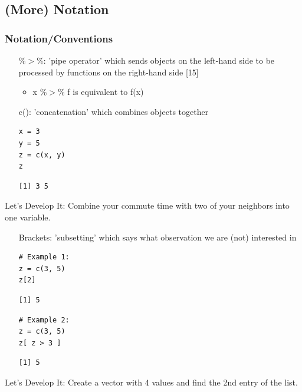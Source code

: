 \subsection{(More) Notation}
\begin{frame}
	\frametitle{Notation/Conventions}

	\vspace{10pt}
	\begin{itemize}
		\item[\%$>$\%:] 'pipe operator' which sends objects on the left-hand side to be processed by functions on the right-hand side [15]
			\begin{itemize}
				\item x \%$>$\% f is equivalent to f(x)
			\end{itemize}
		\item[c():] 'concatenation' which combines objects together
			\begin{lstlisting}
x = 3
y = 5
z = c(x, y) 
z
			\end{lstlisting}
			\begin{verbatim}
[1] 3 5
			\end{verbatim}
	\end{itemize}

\newpage
	\begin{alertblock}{Let's Develop It:}
		Combine your commute time with two of your neighbors into one variable.
	\end{alertblock}	

\newpage
	\begin{itemize}		
		\item[Brackets:] 'subsetting' which says what observation we are (not) interested in
			\begin{lstlisting}
# Example 1:
z = c(3, 5) 
z[2]
			\end{lstlisting}
			\begin{verbatim}
[1] 5
			\end{verbatim}		
			\begin{lstlisting}
# Example 2:
z = c(3, 5) 
z[ z > 3 ]
			\end{lstlisting}
			\begin{verbatim}
[1] 5
			\end{verbatim}						
	\end{itemize}

\newpage
	\begin{alertblock}{Let's Develop It:}
		Create a vector with 4 values and find the 2nd entry of the list.
	\end{alertblock}	
\end{frame}

